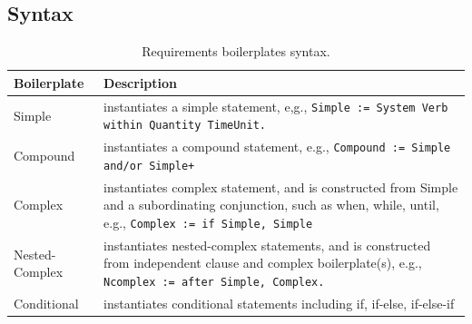 \subsection{Syntax}
\begin{table}[h]\small
	\begin{tabular}{@{}lp{}@{}}
		\toprule
		Boilerplate & Description \\ \midrule
		Simple & instantiates a simple statement, e,g., \texttt{Simple := System Verb within Quantity TimeUnit.} \\
		Compound & instantiates a compound statement, e.g., \texttt{Compound := Simple and/or {Simple}+} \\
		Complex & instantiates complex statement, and is constructed from Simple and a subordinating conjunction, such as when, while, until, e.g., \texttt{Complex := if Simple, Simple} \\
		Nested-Complex & instantiates nested-complex statements, and is constructed from independent clause and complex boilerplate(s), e.g., \texttt{Ncomplex := after Simple, Complex.} \\
		Conditional & instantiates conditional statements including if, if-else, if-else-if \\ \bottomrule
	\end{tabular}
\caption{Requirements boilerplates syntax.}\label{tbl_boilerplates}
\end{table}

\begin{table}[h]
\noindent{}%
\caption{Examples of requirments specified in ReSA.}\label{fig_resa_examples}
\end{table}

